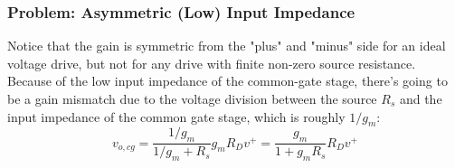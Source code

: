 \subsubsection{Problem:  Asymmetric (Low) Input Impedance}
Notice that the gain is symmetric from the "plus" and "minus" side for an ideal voltage drive, but not for any drive with finite non-zero source resistance.  Because of the low input impedance of the common-gate stage, there's going to be a gain mismatch due to the voltage division between the source $R_s$ and the input impedance of the common gate stage, which is roughly $1/g_m$:
    \begin{equation}
        v_{o,cg} = \frac{1/g_m}{1/g_m + R_s} g_m R_D  v^+ = \frac{g_m}{1 + g_m R_s}  R_D  v^+
    \end{equation} 
